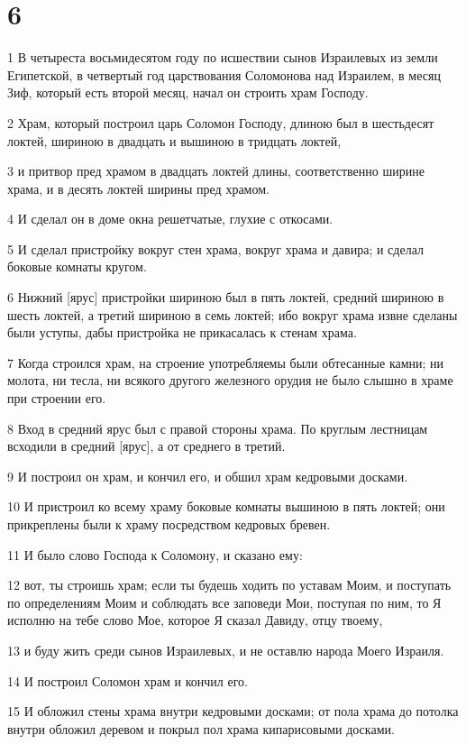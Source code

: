 \chapter{6}

\par 1 В четыреста восьмидесятом году по исшествии сынов Израилевых из земли Египетской, в четвертый год царствования Соломонова над Израилем, в месяц Зиф, который есть второй месяц, начал он строить храм Господу.
\par 2 Храм, который построил царь Соломон Господу, длиною был в шестьдесят локтей, шириною в двадцать и вышиною в тридцать локтей,
\par 3 и притвор пред храмом в двадцать локтей длины, соответственно ширине храма, и в десять локтей ширины пред храмом.
\par 4 И сделал он в доме окна решетчатые, глухие с откосами.
\par 5 И сделал пристройку вокруг стен храма, вокруг храма и давира; и сделал боковые комнаты кругом.
\par 6 Нижний [ярус] пристройки шириною был в пять локтей, средний шириною в шесть локтей, а третий шириною в семь локтей; ибо вокруг храма извне сделаны были уступы, дабы пристройка не прикасалась к стенам храма.
\par 7 Когда строился храм, на строение употребляемы были обтесанные камни; ни молота, ни тесла, ни всякого другого железного орудия не было слышно в храме при строении его.
\par 8 Вход в средний ярус был с правой стороны храма. По круглым лестницам всходили в средний [ярус], а от среднего в третий.
\par 9 И построил он храм, и кончил его, и обшил храм кедровыми досками.
\par 10 И пристроил ко всему храму боковые комнаты вышиною в пять локтей; они прикреплены были к храму посредством кедровых бревен.
\par 11 И было слово Господа к Соломону, и сказано ему:
\par 12 вот, ты строишь храм; если ты будешь ходить по уставам Моим, и поступать по определениям Моим и соблюдать все заповеди Мои, поступая по ним, то Я исполню на тебе слово Мое, которое Я сказал Давиду, отцу твоему,
\par 13 и буду жить среди сынов Израилевых, и не оставлю народа Моего Израиля.
\par 14 И построил Соломон храм и кончил его.
\par 15 И обложил стены храма внутри кедровыми досками; от пола храма до потолка внутри обложил деревом и покрыл пол храма кипарисовыми досками.
